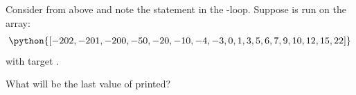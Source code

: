 \begin{prob}
    Consider  from above and note the 
    statement in the -loop. Suppose 
    is run on the array:
    \[
        \python{[-202, -201, -200, -50, -20, -10, -4, -3, 0, 1, 3, 5, 6, 7, 9, 10, 12, 15, 22]}
    \]
    with target .

    What will be the last value of  printed?

\end{prob}
